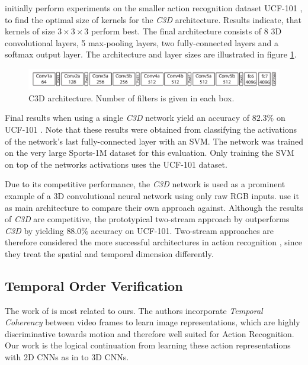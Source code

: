 \textcite{tran_learning_2015} initially perform experiments on the smaller action recognition dataset UCF-101 \cite{soomro_ucf101:_2012}, to find the optimal size of kernels for the \textit{C3D} architecture. Results indicate, that kernels of size $3 \times 3 \times 3$ perform best.
The final architecture consists of 8 3D convolutional layers, 5 max-pooling layers, two fully-connected layers and a softmax output layer.
The architecture and layer sizes are illustrated in figure \ref{fig:c3d_architecture}.

\begin{figure}[H]
    \centering
    \includegraphics[width=\textwidth]{img_related/c3d_architecture}
    \caption{C3D architecture. Number of filters is given in each box. \cite{tran_learning_2015}}
    \label{fig:c3d_architecture}
\end{figure}

Final results when using a single \textit{C3D} network yield an accuracy of $82.3\%$ on UCF-101 \cite{soomro_ucf101:_2012}.
Note that these results were obtained from classifying the activations of the network's last fully-connected layer with an SVM.
The network was trained on the very large Sports-1M dataset \cite{karpathy_large-scale_2014} for this evaluation.
Only training the SVM on top of the networks activations uses the UCF-101 dataset.

Due to its competitive performance, the \textit{C3D} network is used as a prominent example of a 3D convolutional neural network using only raw RGB inputs.
\textcite{carreira_quo_2017} use it as main architecture to compare their own approach against.
Although the results of \textit{C3D} are competitive, the prototypical two-stream approach by \textcite{simonyan_two-stream_2014} outperforms \textit{C3D} by yielding $88.0\%$ accuracy on UCF-101.
Two-stream approaches are therefore considered the more successful architectures in action recognition \cite{wang_action_2015}, since they treat the spatial and temporal dimension differently.


\subsection{Temporal Order Verification}
\label{subsec:tov}

The work of \textcite{misra_shuffle_2016} is most related to ours.
The authors incorporate \textit{Temporal Coherency} between video frames to learn image representations, which are highly discriminative towards motion and therefore well suited for Action Recognition.
Our work is the logical continuation from learning these action representations with 2D CNNs as in \cite{misra_shuffle_2016} to 3D CNNs.

